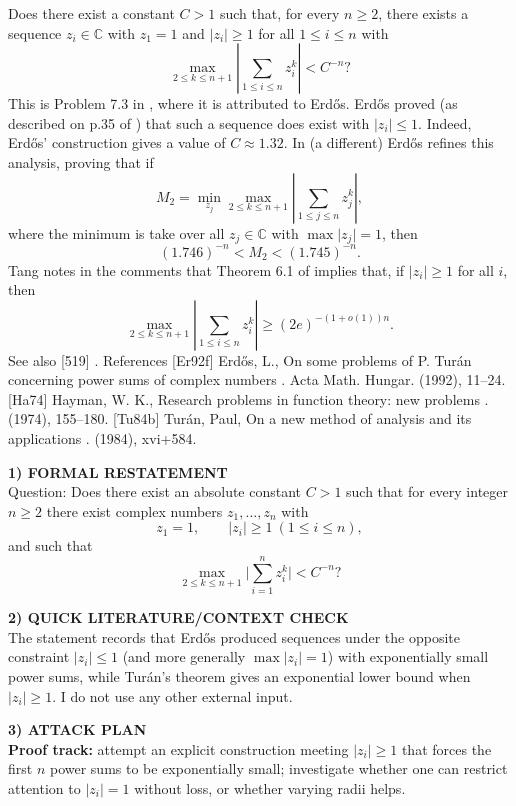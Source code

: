 Does there exist a constant $C>1$ such that, for every $n\geq 2$, there exists a sequence $z_i\in \mathbb{C}$ with $z_1=1$ and $\lvert z_i\rvert \geq 1$ for all $1\leq i\leq n$ with\[\max_{2\leq k\leq n+1}\left\lvert \sum_{1\leq i\leq n}z_i^k\right\rvert < C^{-n}?\] This is Problem 7.3 in \cite{Ha74}, where it is attributed to Erd\H{o}s. Erd\H{o}s proved (as described on p.35 of \cite{Tu84b}) that such a sequence does exist with $\lvert z_i\rvert\leq 1$. Indeed, Erd\H{o}s' construction gives a value of $C\approx 1.32$. In \cite{Er92f} (a different) Erd\H{o}s refines this analysis, proving that if\[M_2=\min_{z_j} \max_{2\leq k\leq n+1} \left\lvert \sum_{1\leq j\leq n}z_j^k\right\rvert,\]where the minimum is take over all $z_j\in \mathbb{C}$ with $\max \lvert z_j\rvert=1$, then\[(1.746)^{-n} < M_2 < (1.745)^{-n}.\]Tang notes in the comments that Theorem 6.1 of \cite{Tu84b} implies that, if $\lvert z_i\rvert \geq 1$ for all $i$, then\[\max_{2\leq k\leq n+1}\left\lvert \sum_{1\leq i\leq n}z_i^k\right\rvert \geq (2e)^{-(1+o(1))n}.\]See also [519] . References [Er92f] Erd\H{o}s, L., On some problems of {P}. {T}ur\'an concerning power sums of complex numbers . Acta Math. Hungar. (1992), 11--24. [Ha74] Hayman, W. K., Research problems in function theory: new problems . (1974), 155--180. [Tu84b] Tur\'an, Paul, On a new method of analysis and its applications . (1984), xvi+584.


\medskip
\noindent\textbf{1) FORMAL RESTATEMENT}\\
Question: Does there exist an absolute constant $C>1$ such that for every integer $n\ge 2$ there exist complex numbers $z_1,\dots,z_n$ with
\[
 z_1=1,\qquad |z_i|\ge 1\ (1\le i\le n),
\]
and such that
\[
 \max_{2\le k\le n+1}\Big|\sum_{i=1}^n z_i^k\Big| < C^{-n}?
\]

\medskip
\noindent\textbf{2) QUICK LITERATURE/CONTEXT CHECK}\\
The statement records that Erd\H{o}s produced sequences under the opposite constraint $|z_i|\le 1$ (and more generally $\max|z_i|=1$) with exponentially small power sums, while Tur\'an's theorem gives an exponential lower bound when $|z_i|\ge 1$.  I do not use any other external input.

\medskip
\noindent\textbf{3) ATTACK PLAN}\\
\textbf{Proof track:} attempt an explicit construction meeting $|z_i|\ge 1$ that forces the first $n$ power sums to be exponentially small; investigate whether one can restrict attention to $|z_i|=1$ without loss, or whether varying radii helps.

